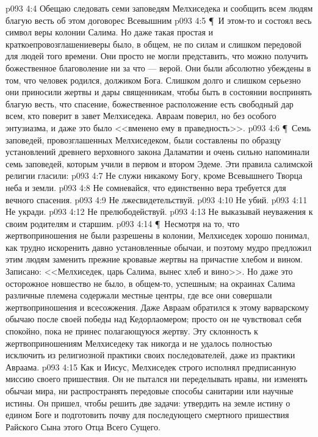 \vs p093 4:4 \bibnobreakspace Обещаю следовать семи заповедям Мелхиседека и сообщить всем людям благую весть об этом договорес Всевышним
\vs p093 4:5 \P\ И этом\hyp{}то и состоял весь символ веры колонии Салима. Но даже такая простая и краткоепровозглашениеверы было, в общем, не по силам и слишком передовой для людей того времени. Они просто не могли представить, что можно получить божественное благоволение ни за что --- верой. Они были абсолютно убеждены в том, что человек родился, должиком Бога. Слишком долго и слишком серьезно они приносили жертвы и дары священникам, чтобы быть в состоянии воспринять благую весть, что спасение, божественное расположение есть свободный дар всем, кто поверит в завет Мелхиседека. Авраам поверил, но без особого энтузиазма, и даже это было <<вменено ему в праведность>>.
\vs p093 4:6 \P\ Семь заповедей, провозглашенных Мелхиседеком, были составлены по образцу установлений древнего верховного закона Даламатии и очень сильно напоминали семь заповедей, которым учили в первом и втором Эдеме. Эти правила салимской религии гласили:
\vs p093 4:7 \bibnobreakspace Не служи никакому Богу, кроме Всевышнего Творца неба и земли.
\vs p093 4:8 \bibnobreakspace Не сомневайся, что единственно вера требуется для вечного спасения.
\vs p093 4:9 \bibnobreakspace Не лжесвидетельствуй.
\vs p093 4:10 \bibnobreakspace Не убий.
\vs p093 4:11 \bibnobreakspace Не укради.
\vs p093 4:12 \bibnobreakspace Не прелюбодействуй.
\vs p093 4:13 \bibnobreakspace Не выказывай неуважения к своим родителям и старшим.
\vs p093 4:14 \P\ Несмотря на то, что жертвоприношения не были разрешены в колонии, Мелхиседек хорошо понимал, как трудно искоренить давно установленные обычаи, и поэтому мудро предложил этим людям заменить прежние кровавые жертвы на причастие хлебом и вином. Записано: <<Мелхиседек, царь Салима, вынес хлеб и вино>>. Но даже это осторожное новшество не было, в общем\hyp{}то, успешным; на окраинах Салима различные племена содержали местные центры, где все они совершали жертвоприношения и всесожжения. Даже Авраам обратился к этому варварскому обычаю после своей победы над Кедорлаомером; просто он не чувствовал себя спокойно, пока не принес полагающуюся жертву. Эту склонность к жертвоприношениям Мелхиседеку так никогда и не удалось полностью исключить из религиозной практики своих последователей, даже из практики Авраама.
\vs p093 4:15 Как и Иисус, Мелхиседек строго исполнял предписанную миссию своего пришествия. Он не пытался ни переделывать нравы, ни изменять обычаи мира, ни распространять передовые способы санитарии или научные истины. Он пришел, чтобы решить две задачи: утвердить на земле истину о едином Боге и подготовить почву для последующего смертного пришествия Райского Сына этого Отца Всего Сущего.
